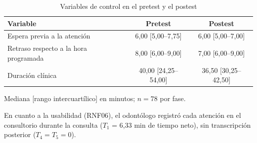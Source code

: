 \begin{table}[H]
\centering
\caption{Variables de control en el pretest y el postest}
\label{tab:ob3_control}
\fontsize{9}{11}\selectfont
\renewcommand{\arraystretch}{1.2}
\setlength{\tabcolsep}{4pt}
\begin{tabularx}{\linewidth}{|>{\raggedright\arraybackslash}X|c|c|}
\hline
\textbf{Variable} & \textbf{Pretest} & \textbf{Postest} \\ \hline
Espera previa a la atención & 6{,}00 [5{,}00--7{,}75] & 6{,}00 [5{,}00--7{,}00] \\ \hline
Retraso respecto a la hora programada & 8{,}00 [6{,}00--9{,}00] & 7{,}00 [6{,}00--9{,}00] \\ \hline
Duración clínica & 40{,}00 [24{,}25--54{,}00] & 36{,}50 [30{,}25--42{,}50] \\ \hline
\end{tabularx}
\vspace{2pt}
{\footnotesize Mediana [rango intercuartílico] en minutos; $n = 78$ por fase.\par}
\end{table}

En cuanto a la usabilidad (RNF06), el odontólogo registró cada atención en el consultorio durante la consulta ($T_1$ = 6,33 min de tiempo neto), sin transcripción posterior ($T_4 = T_5 = 0$).
